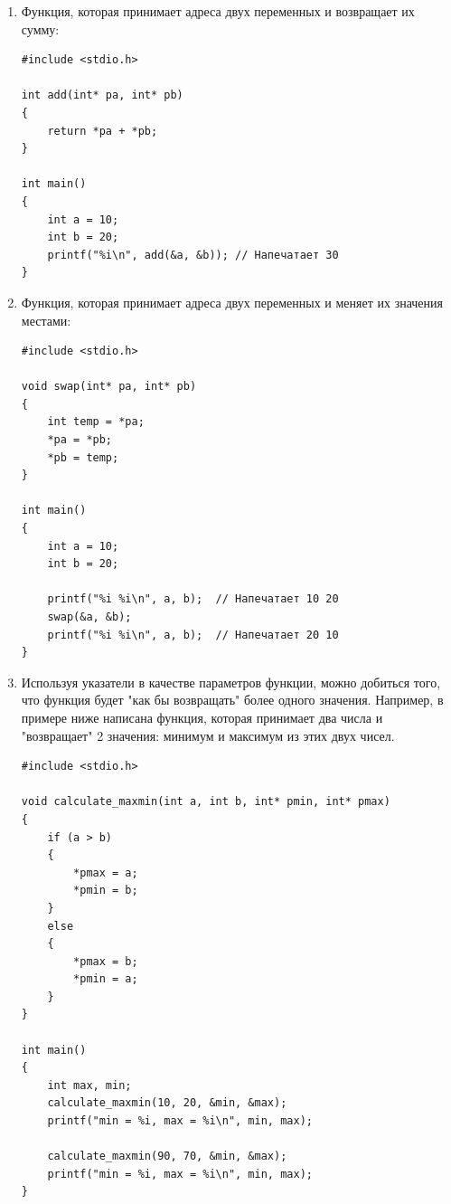 \documentclass[10pt]{article}
\begin{document}
\begin{enumerate}

\item Функция, которая принимает адреса двух переменных и возвращает их сумму:
\begin{lstlisting}
#include <stdio.h>

int add(int* pa, int* pb)
{
    return *pa + *pb;
}

int main()
{
    int a = 10;
    int b = 20;
    printf("%i\n", add(&a, &b)); // Напечатает 30
}
\end{lstlisting}


\item Функция, которая принимает адреса двух переменных и меняет их значения местами:
\begin{lstlisting}
#include <stdio.h>

void swap(int* pa, int* pb)
{
    int temp = *pa;
    *pa = *pb;
    *pb = temp;
}

int main()
{
    int a = 10;
    int b = 20;

    printf("%i %i\n", a, b);  // Напечатает 10 20
    swap(&a, &b);
    printf("%i %i\n", a, b);  // Напечатает 20 10
}
\end{lstlisting}

\item Используя указатели в качестве параметров функции, можно добиться того, что функция будет "как бы возвращать"{} более одного значения. Например, в примере ниже написана функция, которая принимает два числа и "возвращает"{} 2 значения: минимум и максимум из этих двух чисел.

\begin{lstlisting}
#include <stdio.h>

void calculate_maxmin(int a, int b, int* pmin, int* pmax)
{
    if (a > b)
    {
        *pmax = a;
        *pmin = b;
    }
    else
    {
        *pmax = b;
        *pmin = a;
    }
}

int main()
{
    int max, min;
    calculate_maxmin(10, 20, &min, &max);
    printf("min = %i, max = %i\n", min, max);

    calculate_maxmin(90, 70, &min, &max);
    printf("min = %i, max = %i\n", min, max);
}
\end{lstlisting}
\end{enumerate}
\end{document}
